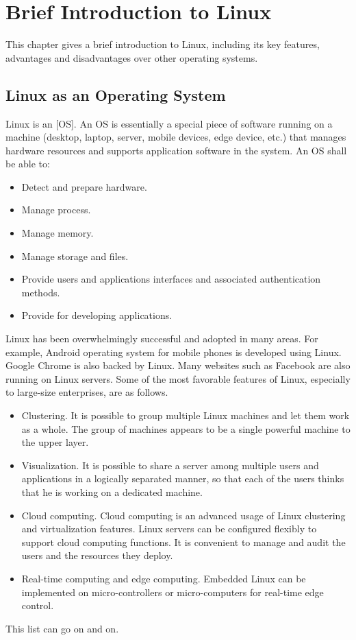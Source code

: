 \chapter{Brief Introduction to Linux}

This chapter gives a brief introduction to Linux, including its key features, advantages and disadvantages over other operating systems.

\section{Linux as an Operating System}

Linux is an [OS]. An OS is essentially a special piece of software running on a machine (desktop, laptop, server, mobile devices, edge device, etc.) that manages hardware resources and supports application software in the system. An OS shall be able to:
\begin{itemize}
  \item Detect and prepare hardware.
  \item Manage process.
  \item Manage memory.
  \item Manage storage and files.
  \item Provide users and applications interfaces and associated authentication methods.
  \item Provide  for developing applications.
\end{itemize}

Linux has been overwhelmingly successful and adopted in many areas. For example, Android operating system for mobile phones is developed using Linux. Google Chrome is also backed by Linux. Many websites such as Facebook are also running on Linux servers. Some of the most favorable features of Linux, especially to large-size enterprises, are as follows.
\begin{itemize}
  \item Clustering. It is possible to group multiple Linux machines and let them work as a whole. The group of machines appears to be a single powerful machine to the upper layer.
  \item Visualization. It is possible to share a server among multiple users and applications in a logically separated manner, so that each of the users thinks that he is working on a dedicated machine.
  \item Cloud computing. Cloud computing is an advanced usage of Linux clustering and virtualization features. Linux servers can be configured flexibly to support cloud computing functions. It is convenient to manage and audit the users and the resources they deploy. 
  \item Real-time computing and edge computing. Embedded Linux can be implemented on micro-controllers or micro-computers for real-time edge control.
\end{itemize}
This list can go on and on.

